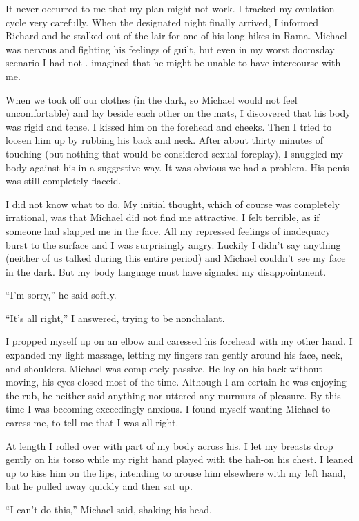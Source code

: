 \documentclass[]{article}
\begin{document}
It never occurred to me that my plan might not work.  I tracked my ovulation cycle very carefully.  When the designated night finally arrived, I informed Richard and he stalked out of the lair for one of his long hikes in Rama.  Michael was nervous and fighting his feelings of guilt, but even in my worst doomsday scenario I had not .  imagined that he might be unable to have intercourse with me.

When we took off our clothes (in the dark, so Michael would not feel uncomfortable) and lay beside each other on the mats, I discovered that his body was rigid and tense.  I kissed him on the forehead and cheeks.  Then I tried to loosen him up by rubbing his back and neck.  After about thirty minutes of touching (but nothing that would be considered sexual foreplay), I snuggled my body against his in a suggestive way.  It was obvious we had a problem.  His penis was still completely flaccid.

I did not know what to do.  My initial thought, which of course was completely irrational, was that Michael did not find me attractive.  I felt terrible, as if someone had slapped me in the face.  All my repressed feelings of inadequacy burst to the surface and I was surprisingly angry.  Luckily I didn’t say anything (neither of us talked during this entire period) and Michael couldn’t see my face in the dark.  But my body language must have signaled my disappointment.

“I’m sorry,” he said softly.

“It’s all right,” I answered, trying to be nonchalant.

I propped myself up on an elbow and caressed his forehead with my other hand.  I expanded my light massage, letting my fingers ran gently around his face, neck, and shoulders.  Michael was completely passive.  He lay on his back without moving, his eyes closed most of the time.  Although I am certain he was enjoying the rub, he neither said anything nor uttered any murmurs of pleasure.  By this time I was becoming exceedingly anxious.  I found myself wanting Michael to caress me, to tell me that I was all right.

At length I rolled over with part of my body across his.  I let my breasts drop gently on his torso while my right hand played with the hah-on his chest.  I leaned up to kiss him on the lips, intending to arouse him elsewhere with my left hand, but he pulled away quickly and then sat up.

“I can’t do this,” Michael said, shaking his head.
\end{document}
